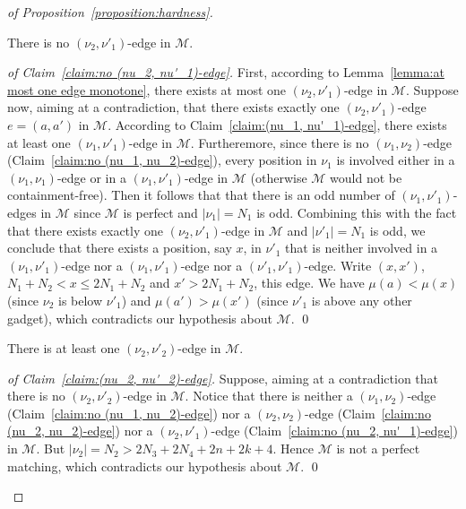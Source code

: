 \documentclass[a4paper]{llncs}
\begin{document}
\begin{proof}[of Proposition~\ref{proposition:hardness}]
  \begin{claim}
    \label{claim:no (nu_2, nu'_1)-edge}
    There is no $(\nu_2, \nu'_1)$-edge in $\mathcal{M}$.
  \end{claim}

  \begin{proof}[of Claim~\ref{claim:no (nu_2, nu'_1)-edge}]
    First, according to Lemma~\ref{lemma:at most one edge monotone},
    there exists at most one $(\nu_2, \nu'_1)$-edge in $\mathcal{M}$.
    Suppose now, aiming at a contradiction, that there exists
    exactly one $(\nu_2, \nu'_1)$-edge $e = (a, a')$ in $\mathcal{M}$.
    According to Claim~\ref{claim:(nu_1, nu'_1)-edge}, there exists at least
    one $(\nu_1, \nu'_1)$-edge in $\mathcal{M}$.
    Furtheremore, since
    there is no $(\nu_1, \nu_2)$-edge (Claim~\ref{claim:no (nu_1, nu_2)-edge}),
    every position in $\nu_1$ is involved either in a
    $(\nu_1, \nu_1)$-edge or in a $(\nu_1, \nu'_1)$-edge in $\mathcal{M}$
    (otherwise $\mathcal{M}$ would not be containment-free).
    Then it follows that that there is an odd number of $(\nu_1, \nu'_1)$-edges
    in $\mathcal{M}$ since $\mathcal{M}$ is perfect and $|\nu_1| = N_1$ is odd.
    Combining this with the fact that there exists exactly one $(\nu_2, \nu'_1)$-edge
    in $\mathcal{M}$ and $|\nu'_1| = N_1$ is odd,
    we conclude that there exists a position, say $x$, in $\nu'_1$
    that is neither involved in a $(\nu_1, \nu'_1)$-edge nor a $(\nu_1, \nu'_1)$-edge
    nor a $(\nu'_1, \nu'_1)$-edge.
    Write $(x, x')$, $N_1+N_2 < x \leq 2N_1 + N_2$ and $x' > 2N_1 + N_2$, this edge.
    We have $\mu(a) < \mu(x)$ (since $\nu_2$ is below $\nu'_1$)
    and $\mu(a') > \mu(x')$ (since $\nu'_1$ is above any other gadget),
    which contradicts our hypothesis about $\mathcal{M}$.
    \qed
  \end{proof}

  \begin{claim}
    \label{claim:(nu_2, nu'_2)-edge}
    There is at least one $(\nu_2, \nu'_2)$-edge in $\mathcal{M}$.
  \end{claim}

  \begin{proof}[of Claim~\ref{claim:(nu_2, nu'_2)-edge}]
    Suppose, aiming at a contradiction that there is no
    $(\nu_2, \nu'_2)$-edge in $\mathcal{M}$.
    Notice that there is neither
    a $(\nu_1, \nu_2)$-edge (Claim~\ref{claim:no (nu_1, nu_2)-edge})
    nor a $(\nu_2, \nu_2)$-edge (Claim~\ref{claim:no (nu_2, nu_2)-edge})
    nor a $(\nu_2, \nu'_1)$-edge (Claim~\ref{claim:no (nu_2, nu'_1)-edge})
    in $\mathcal{M}$.
    But $|\nu_2| = N_2 > 2N_3 + 2N_4 + 2n + 2k +4$.
    Hence $\mathcal{M}$ is not a perfect matching,
    which contradicts our hypothesis about $\mathcal{M}$.
    \qed
  \end{proof}


\end{proof}
\end{document}
